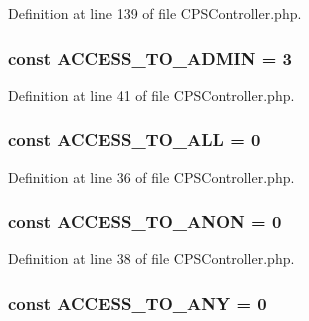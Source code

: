 Definition at line 139 of file CPSController.php.

\hypertarget{classCPSController_a16a362e48c9f7e6757bb15e0a3d9fa4f}{
\subsubsection[{ACCESS\_\-TO\_\-ADMIN}]{\setlength{\rightskip}{0pt plus 5cm}const {\bf ACCESS\_\-TO\_\-ADMIN} = 3}}
\label{classCPSController_a16a362e48c9f7e6757bb15e0a3d9fa4f}


Definition at line 41 of file CPSController.php.

\hypertarget{classCPSController_ab269679ab48227854fa6fa0a6d344324}{
\subsubsection[{ACCESS\_\-TO\_\-ALL}]{\setlength{\rightskip}{0pt plus 5cm}const {\bf ACCESS\_\-TO\_\-ALL} = 0}}
\label{classCPSController_ab269679ab48227854fa6fa0a6d344324}


Definition at line 36 of file CPSController.php.

\hypertarget{classCPSController_abc512a8f331daed89e84a7d8f44775c4}{
\subsubsection[{ACCESS\_\-TO\_\-ANON}]{\setlength{\rightskip}{0pt plus 5cm}const {\bf ACCESS\_\-TO\_\-ANON} = 0}}
\label{classCPSController_abc512a8f331daed89e84a7d8f44775c4}


Definition at line 38 of file CPSController.php.

\hypertarget{classCPSController_a8b17406db740d630ae61ecf3cd9bbd8c}{
\subsubsection[{ACCESS\_\-TO\_\-ANY}]{\setlength{\rightskip}{0pt plus 5cm}const {\bf ACCESS\_\-TO\_\-ANY} = 0}}
\label{classCPSController_a8b17406db740d630ae61ecf3cd9bbd8c}


